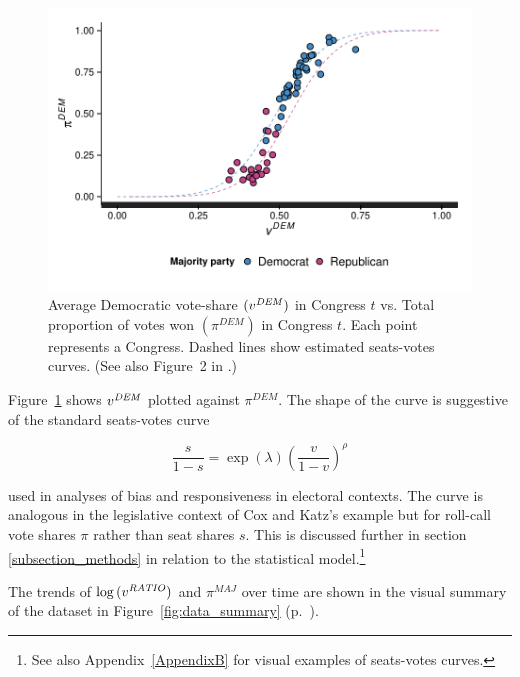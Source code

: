 \begin{figure}
\centering
	\includegraphics[scale=0.75]{sections/figs/vdem_vs_pdem}
\caption{Average Democratic vote-share $(v^{\it DEM})$ in Congress $t$ vs. Total proportion of votes won $(\pi^{DEM})$ in Congress $t$. Each point represents a Congress. Dashed lines show estimated seats-votes curves. (See also Figure~2 in \protect{}.)}
\label{fig:log_vratio_vs_ptdem}
\end{figure}


Figure~\ref{fig:log_vratio_vs_ptdem} shows $v^{\it DEM}$ plotted against $\pi^{DEM}$. The shape of the curve is suggestive of the standard seats-votes curve  

\begin{equation*}
 \frac{s}{1-s} = \exp{(\lambda)}\left(\frac{v}{1-v}\right)^\rho 
\end{equation*}

\noindent used in analyses of bias and responsiveness in electoral contexts. The curve is analogous in the legislative context of Cox and Katz's example but for roll-call vote shares $\pi$ rather than seat shares $s$. This is discussed further in section \ref{subsection_methods} in relation to the statistical model.\footnote{See also Appendix~\ref{AppendixB} for visual examples of seats-votes curves.}

The trends of $\log{(v^{\it RATIO})}$ and $\pi^{MAJ}$ over time are shown in the visual summary of the dataset in Figure~\ref{fig:data_summary} (p.~\pageref{fig:data_summary}). \\[10pt]


